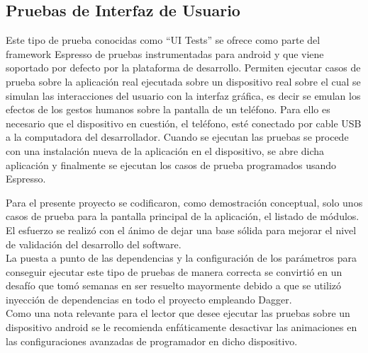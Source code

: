 \subsection{Pruebas de Interfaz de Usuario}
Este tipo de prueba conocidas como ``UI Tests'' se ofrece como parte del framework Espresso de pruebas instrumentadas para android y que viene soportado por defecto por la plataforma de desarrollo. Permiten ejecutar casos de prueba sobre la aplicación real ejecutada sobre un dispositivo real sobre el cual se simulan las interacciones del usuario con la interfaz gráfica, es decir se emulan los efectos de los gestos humanos sobre la pantalla de un teléfono.
Para ello es necesario que el dispositivo en cuestión, el teléfono, esté conectado por cable USB a la computadora del desarrollador. Cuando se ejecutan las pruebas se procede con una instalación nueva de la aplicación en el dispositivo, se abre dicha aplicación y finalmente se ejecutan los casos de prueba programados usando Espresso.

Para el presente proyecto se codificaron, como demostración conceptual, solo unos casos de prueba para la pantalla principal de la aplicación, el listado de módulos. El esfuerzo se realizó con el ánimo de dejar una base sólida para mejorar el nivel de validación del desarrollo del software.\\
La puesta a punto de las dependencias y la configuración de los parámetros para conseguir ejecutar este tipo de pruebas de manera correcta se convirtió en un desafío que tomó semanas en ser resuelto mayormente debido a que se utilizó inyección de dependencias en todo el proyecto empleando Dagger.\\
Como una nota relevante para el lector que desee ejecutar las pruebas sobre un dispositivo android se le recomienda enfáticamente desactivar las animaciones en las configuraciones avanzadas de programador en dicho dispositivo.




